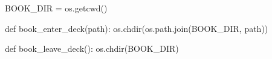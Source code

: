 \usepackage[noamsthm,notheorems]{beamerarticle}
\usepackage[minted]{noweb}
\def\nwidentdefs#1{}
\def\nwidentuses#1{}


\usepackage{etoc}
\setlength{\cftsectionnumwidth}{3em}
\setlength{\cftsubsectionindent}{\dimexpr\cftsectionindent+\cftsectionnumwidth\relax}
\setlength{\cftsubsectionnumwidth}{3.9em}
\setlength{\cftsubsubsectionindent}{\dimexpr\cftsubsectionindent+\cftsubsectionnumwidth\relax}
\setlength{\cftpartnumwidth}{2.8em}


\begin{pycode}
BOOK_DIR = os.getcwd()


def book_enter_deck(path):
    os.chdir(os.path.join(BOOK_DIR, path))


def book_leave_deck():
    os.chdir(BOOK_DIR)
\end{pycode}

